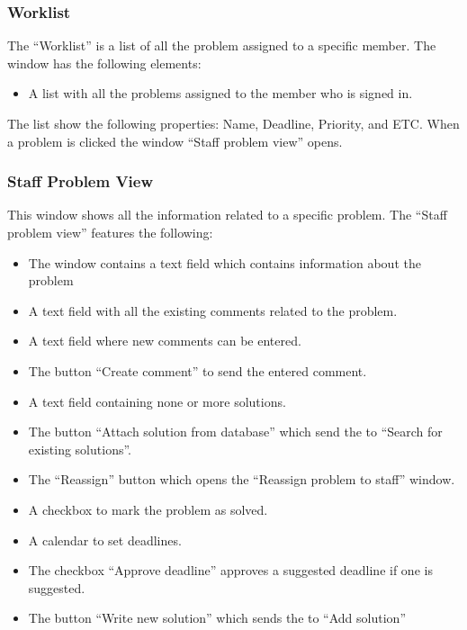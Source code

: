 

\subsubsection{Worklist}
The ``Worklist'' is a list of all the problem assigned to a specific \astaff[] member. The window has the following elements:
\begin{itemize}
	\item A list with all the problems assigned to the \astaff[] member who is signed in.
\end{itemize}
The list show the following properties: Name, Deadline, Priority, and ETC.
When a problem is clicked the window ``Staff problem view'' opens. 


\subsubsection{Staff Problem View}
This window shows all the information related to a specific problem. 
The ``Staff problem view'' features the following:
\begin{itemize}
	\item The window contains a text field which contains information about the problem
	\item A text field with all the existing comments related to the problem.
	\item A text field where new comments can be entered.
	\item The button ``Create comment'' to send the entered comment.
	\item A text field containing none or more solutions.
	\item The button ``Attach solution from database'' which send the \astaff[] to ``Search for existing solutions''.  
	\item The ``Reassign'' button which opens the ``Reassign problem to staff'' window.
	\item A checkbox to mark the problem as solved.
	\item A calendar to set deadlines.
	\item The checkbox ``Approve deadline'' approves a suggested deadline if one is suggested.
	\item The button ``Write new solution'' which sends the \astaff[] to ``Add solution''
\end{itemize}

